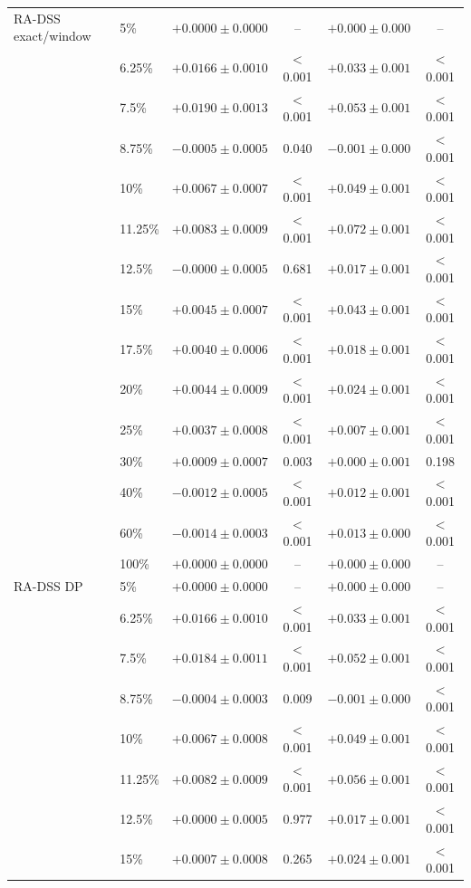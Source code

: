 \begin{tabular}{llcccc}
\midrule
RA-DSS exact/window & 5\% & $+0.0000\pm0.0000$ & -- & $+0.000\pm0.000$ & -- \\
 & 6.25\% & $+0.0166\pm0.0010$ & $<$0.001 & $+0.033\pm0.001$ & $<$0.001 \\
 & 7.5\% & $+0.0190\pm0.0013$ & $<$0.001 & $+0.053\pm0.001$ & $<$0.001 \\
 & 8.75\% & $-0.0005\pm0.0005$ & 0.040 & $-0.001\pm0.000$ & $<$0.001 \\
 & 10\% & $+0.0067\pm0.0007$ & $<$0.001 & $+0.049\pm0.001$ & $<$0.001 \\
 & 11.25\% & $+0.0083\pm0.0009$ & $<$0.001 & $+0.072\pm0.001$ & $<$0.001 \\
 & 12.5\% & $-0.0000\pm0.0005$ & 0.681 & $+0.017\pm0.001$ & $<$0.001 \\
 & 15\% & $+0.0045\pm0.0007$ & $<$0.001 & $+0.043\pm0.001$ & $<$0.001 \\
 & 17.5\% & $+0.0040\pm0.0006$ & $<$0.001 & $+0.018\pm0.001$ & $<$0.001 \\
 & 20\% & $+0.0044\pm0.0009$ & $<$0.001 & $+0.024\pm0.001$ & $<$0.001 \\
 & 25\% & $+0.0037\pm0.0008$ & $<$0.001 & $+0.007\pm0.001$ & $<$0.001 \\
 & 30\% & $+0.0009\pm0.0007$ & 0.003 & $+0.000\pm0.001$ & 0.198 \\
 & 40\% & $-0.0012\pm0.0005$ & $<$0.001 & $+0.012\pm0.001$ & $<$0.001 \\
 & 60\% & $-0.0014\pm0.0003$ & $<$0.001 & $+0.013\pm0.000$ & $<$0.001 \\
 & 100\% & $+0.0000\pm0.0000$ & -- & $+0.000\pm0.000$ & -- \\
\midrule
RA-DSS DP & 5\% & $+0.0000\pm0.0000$ & -- & $+0.000\pm0.000$ & -- \\
 & 6.25\% & $+0.0166\pm0.0010$ & $<$0.001 & $+0.033\pm0.001$ & $<$0.001 \\
 & 7.5\% & $+0.0184\pm0.0011$ & $<$0.001 & $+0.052\pm0.001$ & $<$0.001 \\
 & 8.75\% & $-0.0004\pm0.0003$ & 0.009 & $-0.001\pm0.000$ & $<$0.001 \\
 & 10\% & $+0.0067\pm0.0008$ & $<$0.001 & $+0.049\pm0.001$ & $<$0.001 \\
 & 11.25\% & $+0.0082\pm0.0009$ & $<$0.001 & $+0.056\pm0.001$ & $<$0.001 \\
 & 12.5\% & $+0.0000\pm0.0005$ & 0.977 & $+0.017\pm0.001$ & $<$0.001 \\
 & 15\% & $+0.0007\pm0.0008$ & 0.265 & $+0.024\pm0.001$ & $<$0.001 \\

\end{tabular}
